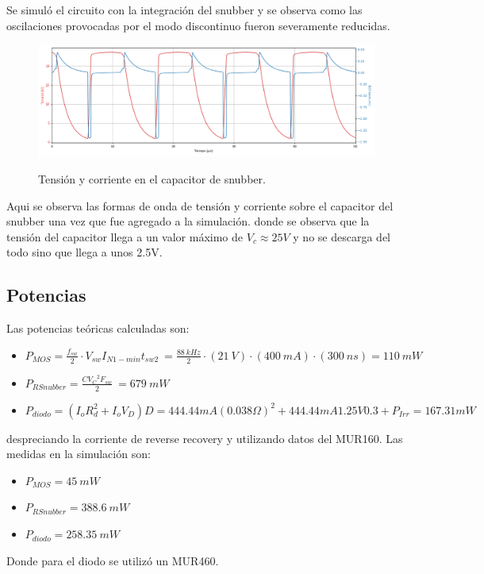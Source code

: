 Se simuló el circuito con la integración del snubber y se observa como las oscilaciones provocadas por el modo discontinuo fueron severamente reducidas.
\begin{figure}[H]
	\centering
	\includegraphics[width=0.9\linewidth]{ImagenesParteII/Cap_snub.png}
	\label{fig:tensionesvarias}
	\caption{Tensión y corriente en el capacitor de snubber.}
\end{figure}
Aqui se observa las formas de onda de tensión y corriente sobre el capacitor del snubber una vez que fue agregado a la simulación. donde se observa que la tensión del capacitor llega a un valor máximo de $V_c \approx 25V$ y no se descarga del todo sino que llega a unos 2.5V.
\subsection{Potencias}
Las potencias teóricas calculadas son:
\begin{itemize}
\item $ P_{MOS} =\frac{f_{sw}}{2}\cdot V_{sw}I_{N1-min} t_{sw2}\ =\frac{88 \ kHz}{2}\cdot (21 \ V) \cdot (400 \ mA) \cdot (300 \ ns) = 110\ mW$
\item $ P_{RSnubber} = \frac{C{V_C}^2 F_{sw}}{2}\ = 679 \ mW$
\item $P_{diodo} = (I_oR_{d}^2 + I_oV_D)D = 444.44mA (0.038\Omega )^2 + 444.44mA 1.25V 0.3 + P_{Irr} = 167.31mW$

\end{itemize}
despreciando la corriente de reverse recovery y utilizando datos del MUR160.
Las medidas en la simulación son:
\begin{itemize}
\item $ P_{MOS} = 45 \ mW $
\item $ P_{RSnubber} = 388.6 \ mW$
\item $ P_{diodo} = 258.35 \ mW$
\end{itemize}
Donde para el diodo se utilizó un MUR460.
